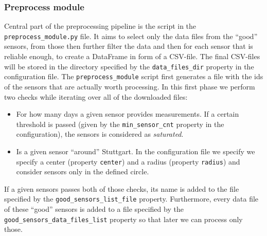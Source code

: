 \documentclass[12pt,a4paper,twoside]{scrartcl}
\numberwithin{equation}{section}
\begin{document}
\subsubsection{Preprocess module}\label{sec:preproc-module}
Central part of the preprocessing pipeline is the script in the \texttt{preprocess\_module.py} file. It aims to select only the data files from the ``good'' sensors, from those then further filter the data and then for each sensor that is reliable enough, to create a DataFrame in form of a CSV-file. The final CSV-files will be stored in the directory specified by the \texttt{data\_files\_dir} property in the configuration file. The \texttt{preprocess\_module} script first generates a file with the ids of the sensors that are actually worth processing. In this first phase we perform two checks while iterating over all of the downloaded files:
\begin{itemize}
\item For how many days a given sensor provides measurements. If a certain threshold is passed (given by the \texttt{min\_sensor\_cnt} property in the configuration), the sensors is considered as \emph{saturated}.
\item Is a given sensor ``around'' Stuttgart. In the configuration file we specify we specify a center (property \texttt{center}) and a radius (property \texttt{radius}) and consider sensors only in the defined circle.
\end{itemize}
If a given sensors passes both of those checks, its name is added to the file specified by the \texttt{good\_sensors\_list\_file} property. Furthermore, every data file of these ``good'' sensors is added to a file specified by the \texttt{good\_sensors\_data\_files\_list} property so that later we can process only those. 
\end{document}
